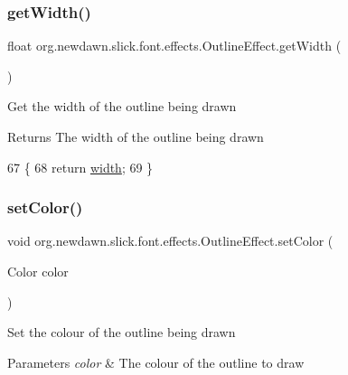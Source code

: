 \subsubsection{\texorpdfstring{get\+Width()}{getWidth()}}
{\footnotesize\ttfamily float org.\+newdawn.\+slick.\+font.\+effects.\+Outline\+Effect.\+get\+Width (\begin{DoxyParamCaption}{ }\end{DoxyParamCaption})\hspace{0.3cm}{\ttfamily [inline]}}

Get the width of the outline being drawn

\begin{DoxyReturn}{Returns}
The width of the outline being drawn 
\end{DoxyReturn}

\begin{DoxyCode}
67                             \{
68         \textcolor{keywordflow}{return} \mbox{\hyperlink{classorg_1_1newdawn_1_1slick_1_1font_1_1effects_1_1_outline_effect_aad96e33c4fb5804e7423df04e1cc1936}{width}};
69     \}
\end{DoxyCode}
\mbox{\label{classorg_1_1newdawn_1_1slick_1_1font_1_1effects_1_1_outline_effect_ac8ecec969733b28ed4ceca221fea8193}} 
\subsubsection{\texorpdfstring{set\+Color()}{setColor()}}
{\footnotesize\ttfamily void org.\+newdawn.\+slick.\+font.\+effects.\+Outline\+Effect.\+set\+Color (\begin{DoxyParamCaption}\item[{Color}]{color }\end{DoxyParamCaption})\hspace{0.3cm}{\ttfamily [inline]}}

Set the colour of the outline being drawn


\begin{DoxyParams}{Parameters}
{\em color} & The colour of the outline to draw \\
\hline
\end{DoxyParams}

